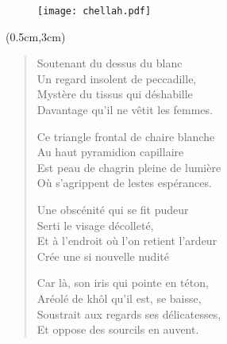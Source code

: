\begin{figure}[h]
\centering
\texttt{[image: chellah.pdf]}
\captionsetup{labelformat=empty}
\caption[Idéotexte du  (\textarabic{شالة})]{}
\end{figure}

\newpage{}
\begin{textblock*}{8cm}(0.5cm,3cm) 
\begin{verse}\quatrain
  Soutenant du dessus du blanc \label{foot.litham}\\  %
  Un regard insolent de peccadille,\\  %
  Mystère du tissus qui déshabille\\  %
  Davantage qu’il ne vêtit les femmes.

  Ce triangle frontal de chaire blanche\\  %
  Au haut pyramidion capillaire\\  %
  Est peau de chagrin pleine de lumière\\  %
  Où s’agrippent de lestes espérances.

  Une obscénité qui se fit pudeur\\  %
  Serti le visage décolleté,\\  %
  Et à l’endroit où l’on retient l’ardeur\\  %
  Crée une si nouvelle nudité


  Car là, son iris qui pointe en téton, \\  %
  Aréolé de khôl qu’il est, se baisse, \\  %
  Soustrait aux regards ses délicatesses, \\  %
  Et oppose des sourcils en auvent.  %


\end{verse}
\end{textblock*}
